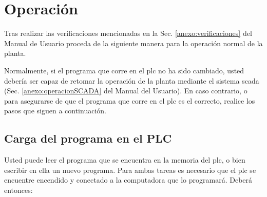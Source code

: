 \section{Operación}
\label{anexo:operacion}

Tras realizar las verificaciones mencionadas en la Sec. 
\ref{anexo:verificaciones} del Manual de Usuario proceda de la siguiente
manera para la operación normal de la planta.

Normalmente, si el programa que corre en el \gls{plc} no ha sido cambiado,
usted debería ser capaz de retomar la operación de la planta mediante el 
sistema \gls{scada} (Sec. \ref{anexo:operacionSCADA} del Manual del Usuario).
En caso contrario, o para asegurarse de que el programa que corre en el
\gls{plc} es el correcto, realice los pasos que siguen a continuación.

\subsection{Carga del programa en el PLC}
\label{anexo:operacionPLC}

Usted puede leer el programa que se encuentra en la memoria del \gls{plc}, o
bien escribir en ella un nuevo programa.
Para ambas tareas es necesario que el \gls{plc} se encuentre encendido y
conectado a la computadora que lo programará.
Deberá entonces:


